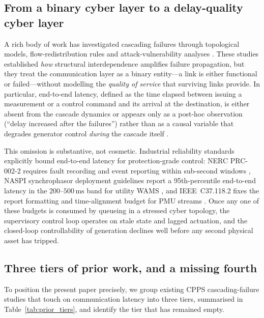 \subsection*{From a binary cyber layer to a delay-quality cyber layer}

A rich body of work has investigated cascading failures through
topological models, flow-redistribution rules and attack-vulnerability
analyses
\citep{Motter2002,Dobson2007,Brummitt2012,Schneider2011}.
These studies established \emph{how} structural interdependence amplifies
failure propagation, but they treat the communication layer as a binary
entity---a link is either functional or failed---without modelling the
\emph{quality of service} that surviving links provide.  In particular,
end-to-end latency, defined as the time elapsed between issuing a
measurement or a control command and its arrival at the destination, is
either absent from the cascade dynamics or appears only as a post-hoc
observation (``delay increased after the failures'') rather than as a
causal variable that degrades generator control \emph{during} the
cascade itself \citep{Milano2012}.

This omission is substantive, not cosmetic.  Industrial reliability
standards explicitly bound end-to-end latency for protection-grade
control: NERC PRC-002-2 requires fault recording and event reporting
within sub-second windows \citep{NERC_PRC002}, NASPI synchrophasor
deployment guidelines report a 95th-percentile end-to-end latency in the
$200$--$500\,\textrm{ms}$ band for utility WAMS
\citep{NASPI_LatencyGuidelines}, and IEEE~C37.118.2 fixes the report
formatting and time-alignment budget for PMU streams
\citep{IEEE_C37_118_2}.  Once any one of these budgets is consumed by
queueing in a stressed cyber topology, the supervisory control loop
operates on stale state and lagged actuation, and the closed-loop
controllability of generation declines well before any second physical
asset has tripped.

\subsection*{Three tiers of prior work, and a missing fourth}

To position the present paper precisely, we group existing CPPS
cascading-failure studies that touch on communication latency into three
tiers, summarised in Table~\ref{tab:prior_tiers}, and identify the tier
that has remained empty.

